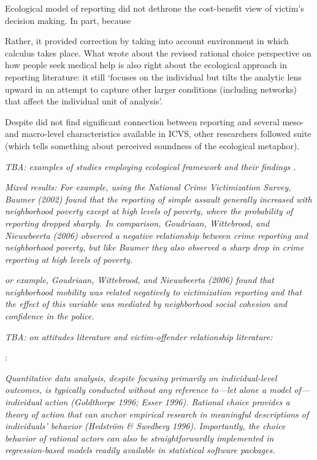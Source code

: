 \documentclass[]{article}
\begin{document}
Ecological model of reporting did not dethrone the cost-benefit view of victim's decision making. In part, because 


Rather, it provided correction by taking into account environment in which calculus takes place. What \cite{pescosolido1992beyond} wrote about the revised rational choice perspective on how people seek medical help is also right about the ecological approach in reporting literature: it still `focuses on the individual but tilts the analytic lens upward in an attempt to capture other larger conditions (including networks) that affect the individual unit of analysis'. 


Despite \cite{goudriaan2004reporting} did not find significant connection between reporting and several meso- and macro-level characteristics available in ICVS, other researchers followed suite (which tells something about perceived soundness of the ecological metaphor).  







\textit{TBA: examples of studies employing ecological framework and their findings \citep{berg2017mobilization, baumer2002neighborhood, goudriaan2006neighbourhood}.}


	
\textit{Mixed results:	For example, using the National Crime Victimization Survey, Baumer (2002) found that the reporting of simple assault generally increased with neighborhood poverty except at high levels of poverty, where the probability of reporting dropped sharply. In comparison, Goudriaan, Wittebrood, and Nieuwbeerta (2006) observed a negative relationship between crime reporting and neighborhood poverty, but like Baumer they also observed a sharp drop in crime reporting at high levels of poverty.}

\textit{or example, Goudriaan, Wittebrood, and Nieuwbeerta (2006) found that neighborhood mobility was related negatively to victimization reporting and that the effect of this variable was mediated by neighborhood social cohesion and confidence in the police.}


	\textit{TBA: on attitudes literature \citep{boateng2018crime,ann2010neighborhood,warner2007directly} and victim-offender relationship literature: }



\cite{bruch2017decision} :

\textit{Quantitative data analysis, despite focusing primarily on individual-level outcomes, is typically conducted without any reference to—let alone a model of—individual action (Goldthorpe 1996; Esser 1996). Rational choice provides a theory of action that can anchor empirical research in meaningful descriptions of individuals’ behavior (Hedström \& Swedberg 1996). Importantly, the choice behavior of rational actors can also be straightforwardly implemented in regression-based models readily available in statistical software packages.}
\end{document}
